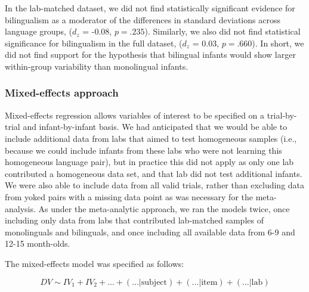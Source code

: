 \documentclass[,man,floatsintext]{apa6}
\begin{document}
In the lab-matched dataset, we did not find statistically significant evidence for bilingualism as a moderator of the differences in standard deviations across language groups, (\(d_z\) = -0.08, \(p = .235\)). Similarly, we also did not find statistical significance for bilingualism in the full dataset, (\(d_z\) = 0.03, \(p = .660\)). In short, we did not find support for the hypothesis that bilingual infants would show larger within-group variability than monolingual infants.

\hypertarget{mixed-effects-approach}{%
\subsubsection{Mixed-effects approach}\label{mixed-effects-approach}}

Mixed-effects regression allows variables of interest to be specified on a trial-by-trial and infant-by-infant basis. We had anticipated that we would be able to include additional data from labs that aimed to test homogeneous samples (i.e., because we could include infants from these labs who were not learning this homogeneous language pair), but in practice this did not apply as only one lab contributed a homogeneous data set, and that lab did not test additional infants. We were also able to include data from all valid trials, rather than excluding data from yoked pairs with a missing data point as was necessary for the meta-analysis. As under the meta-analytic approach, we ran the models twice, once including only data from labs that contributed lab-matched samples of monolinguals and bilinguals, and once including all available data from 6-9 and 12-15 month-olds.

The mixed-effects model was specified as follows:

\[DV \sim IV_1 + IV_2 + \text{...} + (\text{...} | \text{subject}) + (\text{...} | \text{item}) + (\text{...} | \text{lab})\]
\end{document}
